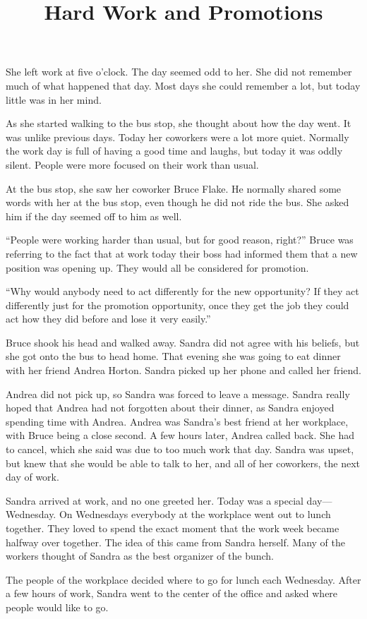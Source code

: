 \documentclass[12pt,letterpaper]{article}
\title{Hard Work and Promotions}
\begin{document}
She left work at five o'clock.
The day seemed odd to her.
She did not remember much of what happened that day.
Most days she could remember a lot, but today little was in her mind.

As she started walking to the bus stop, she thought about how the day went.
It was unlike previous days.
Today her coworkers were a lot more quiet.
Normally the work day is full of having a good time and laughs, but today it was oddly silent.
People were more focused on their work than usual.

At the bus stop, she saw her coworker Bruce Flake.
He normally shared some words with her at the bus stop, even though he did not ride the bus.
She asked him if the day seemed off to him as well.

``People were working harder than usual, but for good reason, right?''  Bruce was referring to the fact that at work today their boss had informed them that a new position was opening up.
They would all be considered for promotion.

``Why would anybody need to act differently for the new opportunity?
If they act differently just for the promotion opportunity, once they get the job they could act how they did before and lose it very easily.''

Bruce shook his head and walked away.
Sandra did not agree with his beliefs, but she got onto the bus to head home.
That evening she was going to eat dinner with her friend Andrea Horton.
Sandra picked up her phone and called her friend.

Andrea did not pick up, so Sandra was forced to leave a message.
Sandra really hoped that Andrea had not forgotten about their dinner, as Sandra enjoyed spending time with Andrea.
Andrea was Sandra's best friend at her workplace, with Bruce being a close second.
A few hours later, Andrea called back.
She had to cancel, which she said was due to too much work that day.
Sandra was upset, but knew that she would be able to talk to her, and all of her coworkers, the next day of work.

Sandra arrived at work, and no one greeted her.
Today was a special day---Wednesday.
On Wednesdays everybody at the workplace went out to lunch together.
They loved to spend the exact moment that the work week became halfway over together.
The idea of this came from Sandra herself.
Many of the workers thought of Sandra as the best organizer of the bunch.

The people of the workplace decided where to go for lunch each Wednesday.
After a few hours of work, Sandra went to the center of the office and asked where people would like to go.
\end{document}
